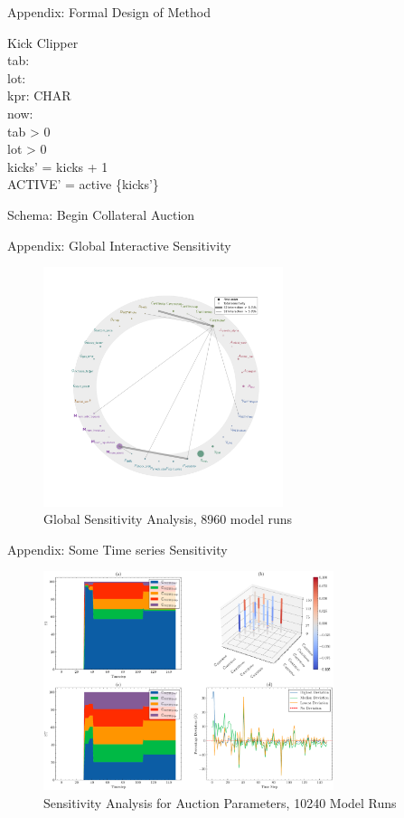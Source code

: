 \documentclass{beamer}
\begin{document}
\begin{frame}{Appendix: Formal Design of Method}
\begin{schema}{Kick}
\Delta Clipper \\
tab: \real \\
lot: \real \\
kpr: \seq CHAR \\
now: \nat \\
\where
tab > 0 \\
lot > 0 \\
kicks' = kicks + 1 \\
ACTIVE' = active \cup \{kicks'\} \\
\end{schema}

\centering
\normalsize{Schema: Begin Collateral Auction}
\vfill  %
\end{frame}


\begin{frame}{Appendix: Global Interactive Sensitivity}
\begin{figure}
\centering
\includegraphics[width=70mm]{Figs/Sobol' Sensitivity Analysis, 8960 Model Runs.pdf}
\caption{Global Sensitivity Analysis, 8960 model runs}
\label{fig3}
\end{figure}
\end{frame}

\begin{frame}{Appendix: Some Time series Sensitivity}
\begin{figure}
\centering
\includegraphics[width=85mm]{Figs/SOBOL_time_series_for_problem_cliplike_n10.pdf}
\caption{Sensitivity Analysis for Auction Parameters, 10240 Model Runs}
\label{fig4}
\end{figure}
\end{frame}
\end{document}
